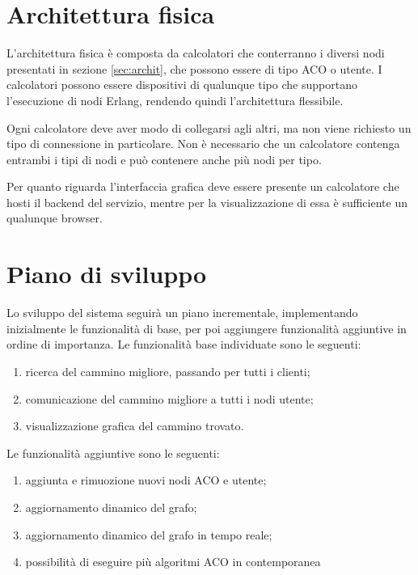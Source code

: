 \section{Architettura fisica}
L'architettura fisica è composta da calcolatori che conterranno i diversi nodi presentati in sezione \ref{sec:archit}, che possono essere di tipo ACO o utente.
I calcolatori possono essere dispositivi di qualunque tipo che supportano l'esecuzione di nodi Erlang, rendendo quindi l'architettura flessibile.

Ogni calcolatore deve aver modo di collegarsi agli altri, ma non viene richiesto un tipo di connessione in particolare. 
Non è necessario che un calcolatore contenga entrambi i tipi di nodi e può contenere anche più nodi per tipo.

Per quanto riguarda l'interfaccia grafica deve essere presente un calcolatore che hosti il backend del servizio, mentre per la visualizzazione di essa è sufficiente un qualunque browser.

\pagebreak
\section{Piano di sviluppo}\label{sec:dev}
Lo sviluppo del sistema seguirà un piano incrementale, implementando inizialmente le funzionalità di base,
per poi aggiungere funzionalità aggiuntive in ordine di importanza.
Le funzionalità base individuate sono le seguenti:
\begin{enumerate}
    \item ricerca del cammino migliore, passando per tutti i clienti;
    \item comunicazione del cammino migliore a tutti i nodi utente;
    \item visualizzazione grafica del cammino trovato.
\end{enumerate}
Le funzionalità aggiuntive sono le seguenti:
\begin{enumerate}
    \item aggiunta e rimuozione nuovi nodi ACO e utente;
    \item aggiornamento dinamico del grafo;
    \item aggiornamento dinamico del grafo in tempo reale;
    \item possibilità di eseguire più algoritmi ACO in contemporanea
\end{enumerate}